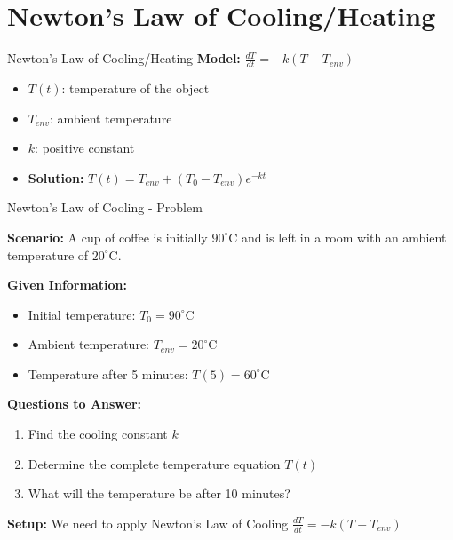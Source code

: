 \documentclass[10pt,aspectratio=169]{beamer}
\begin{document}
\section{Newton's Law of Cooling/Heating}
\begin{frame}{Newton's Law of Cooling/Heating}
    \textbf{Model:} $\frac{dT}{dt} = -k(T - T_{env})$
    \begin{itemize}
        \item $T(t)$: temperature of the object
        \item $T_{env}$: ambient temperature
        \item $k$: positive constant
        \item \textbf{Solution:} $T(t) = T_{env} + (T_0 - T_{env})e^{-kt}$
    \end{itemize}
\end{frame}

\begin{frame}{Newton's Law of Cooling - Problem}
    \begin{problembox}
        \textbf{Scenario:} A cup of coffee is initially $90^{\circ}\text{C}$ and is left in a room with an ambient temperature of $20^{\circ}\text{C}$.
        
        \textbf{Given Information:}
        \begin{itemize}
            \item Initial temperature: $T_0 = 90^{\circ}\text{C}$
            \item Ambient temperature: $T_{env} = 20^{\circ}\text{C}$
            \item Temperature after 5 minutes: $T(5) = 60^{\circ}\text{C}$
        \end{itemize}
        
        \textbf{Questions to Answer:}
        \begin{enumerate}
            \item Find the cooling constant $k$
            \item Determine the complete temperature equation $T(t)$
            \item What will the temperature be after 10 minutes?
        \end{enumerate}
        
        \textbf{Setup:} We need to apply Newton's Law of Cooling $\frac{dT}{dt} = -k(T - T_{env})$
    \end{problembox}
\end{frame}
\end{document}
